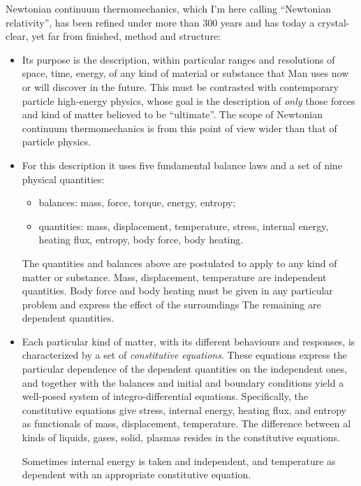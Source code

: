 \documentclass[\ifafour a4paper,12pt,\else a5paper,10pt,\fi%
onecolumn,oneside,article,%
british%
]{memoir}
\theoremstyle{remark}
\theoremstyle{innote}
\renewcommand*{\|}{\nonscript\,\vert\nonscript\;\mathopen{}}
\begin{document}
Newtonian continuum thermomechanics, which I'm here calling
\enquote{Newtonian relativity}, has been refined under more than 300 years
and has today a crystal-clear, yet far from finished, method and structure:
\begin{itemize}[para]
\item Its purpose is the description, within particular ranges and
  resolutions of space, time, energy, of any kind of material or substance
  that Man uses now or will discover in the future. This must be contrasted
  with contemporary particle high-energy physics, whose goal is the
  description of \emph{only} those forces and kind of matter believed to be
  \enquote{ultimate}. The scope of Newtonian continuum thermomechanics is
  from this point of view wider than that of particle physics.
\item For this description it uses five fundamental balance laws and a set
  of nine physical quantities:
  \begin{itemize}
  \item balances: mass, force, torque, energy, entropy;
  \item quantities: mass, displacement, temperature, stress,
    internal energy, heating flux, entropy, body force, body heating.
  \end{itemize}
  The quantities and balances above are postulated to apply to any kind of
  matter or substance. Mass, displacement, temperature are independent
  quantities. Body force and body heating must be given in any particular
  problem and express the effect of the surroundings The remaining are
  dependent quantities.
\item Each particular kind of matter, with its different behaviours and
  responses, is characterized by a set of \emph{constitutive equations}.
  These equations express the particular dependence of the dependent
  quantities on the independent ones, and together with the balances and
  initial and boundary conditions yield a well-posed system of
  integro-differential equations. Specifically, the constitutive equations
  give stress, internal energy, heating flux, and entropy as functionals of
  mass, displacement, temperature. The difference between al kinds of
  liquids, gases, solid, plasmas resides in the constitutive equations.
  
  Sometimes internal energy is taken and independent, and temperature as
  dependent with an appropriate constitutive equation.
\end{itemize}
\end{document}
